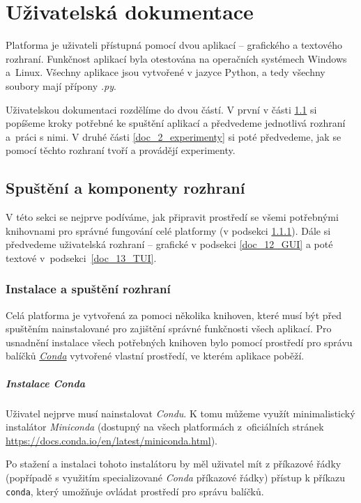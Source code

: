 \chapter{Uživatelská dokumentace}
Platforma je uživateli přístupná pomocí dvou aplikací -- grafického a textového
rozhraní. Funkčnost aplikací byla otestována na operačních systémech Windows
a~Linux. Všechny aplikace jsou vytvořené v jazyce Python, a tedy všechny
soubory mají přípony \emph{.py}. 

Uživatelskou dokumentaci rozdělíme do dvou částí. V první v části
\ref{doc_1_spust_a_kompon} si popíšeme kroky potřebné ke spuštění aplikací a
předvedeme jednotlivá rozhraní a~práci s nimi. V druhé části
\ref{doc_2_experimenty} si poté předvedeme, jak se pomocí těchto rozhraní tvoří
a provádějí experimenty.

\section{Spuštění a komponenty rozhraní} \label{doc_1_spust_a_kompon}

V této sekci se nejprve podíváme, jak připravit prostředí se všemi potřebnými
knihovnami pro správné fungování celé platformy (v podsekci
\ref{doc_11_spust}). Dále si předvedeme uživatelská rozhraní -- grafické v
podsekci \ref{doc_12_GUI} a poté textové v~podsekci~\ref{doc_13_TUI}.

\subsection{Instalace a spuštění rozhraní} \label{doc_11_spust}
Celá platforma je vytvořená za pomoci několika knihoven, které musí být před
spuštěním nainstalované pro zajištění správné funkčnosti všech aplikací. Pro
usnadnění instalace všech potřebných knihoven bylo pomocí prostředí pro správu
balíčků \href{https://conda.org/}{\emph{Conda}} vytvořené vlastní prostředí, ve
kterém aplikace poběží. 

\paragraph{Instalace \emph{Conda}}

Uživatel nejprve musí nainstalovat \emph{Condu}. K tomu můžeme využít
minimalistický instalátor \emph{Miniconda} (dostupný na všech platformách
z~oficiálních stránek \url{https://docs.conda.io/en/latest/miniconda.html}).

Po stažení a instalaci tohoto instalátoru by měl uživatel mít z příkazové řádky
(popřípadě s využitím specializované \emph{Conda} příkazové řádky) přístup k
příkazu \texttt{conda}, který umožňuje ovládat prostředí pro správu balíčků. 

